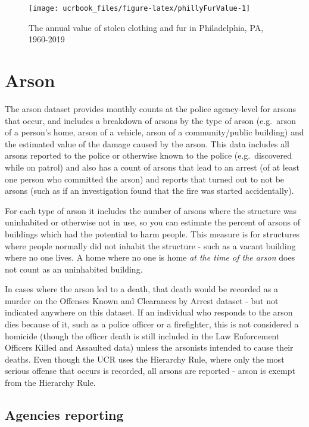 \documentclass[
  12pt,
  openany]{book}
\begin{document}
\begin{figure}

{\centering \texttt{[image: ucrbook\_files/figure-latex/phillyFurValue-1]} 

}

\caption{The annual value of stolen clothing and fur in Philadelphia, PA, 1960-2019}\label{fig:phillyFurValue}
\end{figure}

\hypertarget{arson-1}{%
\chapter{Arson}\label{arson-1}}

The arson dataset provides monthly counts at the police agency-level for arsons that occur, and includes a breakdown of arsons by the type of arson (e.g.~arson of a person's home, arson of a vehicle, arson of a community/public building) and the estimated value of the damage caused by the arson. This data includes all arsons reported to the police or otherwise known to the police (e.g.~discovered while on patrol) and also has a count of arsons that lead to an arrest (of at least one person who committed the arson) and reports that turned out to not be arsons (such as if an investigation found that the fire was started accidentally).

For each type of arson it includes the number of arsons where the structure was uninhabited or otherwise not in use, so you can estimate the percent of arsons of buildings which had the potential to harm people. This measure is for structures where people normally did not inhabit the structure - such as a vacant building where no one lives. A home where no one is home \emph{at the time of the arson} does not count as an uninhabited building.

In cases where the arson led to a death, that death would be recorded as a murder on the Offenses Known and Clearances by Arrest dataset - but not indicated anywhere on this dataset. If an individual who responds to the arson dies because of it, such as a police officer or a firefighter, this is not considered a homicide (though the officer death is still included in the Law Enforcement Officers Killed and Assaulted data) unless the arsonists intended to cause their deaths. Even though the UCR uses the Hierarchy Rule, where only the most serious offense that occurs is recorded, all arsons are reported - arson is exempt from the Hierarchy Rule.

\hypertarget{agencies-reporting-4}{%
\section{Agencies reporting}\label{agencies-reporting-4}}
\end{document}
